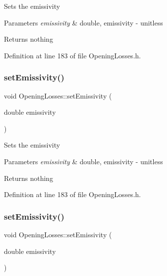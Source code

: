 Sets the emissivity


\begin{DoxyParams}{Parameters}
{\em emissivity} & double, emissivity -\/ unitless\\
\hline
\end{DoxyParams}
\begin{DoxyReturn}{Returns}
nothing 
\end{DoxyReturn}


Definition at line 183 of file Opening\+Losses.\+h.

\mbox{\label{class_opening_losses_aa63eb1c2ba9057d401f3a7f5dd974afe}} 
\subsubsection{\texorpdfstring{set\+Emissivity()}{setEmissivity()}\hspace{0.1cm}{\footnotesize\ttfamily [2/3]}}
{\footnotesize\ttfamily void Opening\+Losses\+::set\+Emissivity (\begin{DoxyParamCaption}\item[{double}]{emissivity }\end{DoxyParamCaption})\hspace{0.3cm}{\ttfamily [inline]}}

Sets the emissivity


\begin{DoxyParams}{Parameters}
{\em emissivity} & double, emissivity -\/ unitless\\
\hline
\end{DoxyParams}
\begin{DoxyReturn}{Returns}
nothing 
\end{DoxyReturn}


Definition at line 183 of file Opening\+Losses.\+h.

\mbox{\label{class_opening_losses_aa63eb1c2ba9057d401f3a7f5dd974afe}} 
\subsubsection{\texorpdfstring{set\+Emissivity()}{setEmissivity()}\hspace{0.1cm}{\footnotesize\ttfamily [3/3]}}
{\footnotesize\ttfamily void Opening\+Losses\+::set\+Emissivity (\begin{DoxyParamCaption}\item[{double}]{emissivity }\end{DoxyParamCaption})\hspace{0.3cm}{\ttfamily [inline]}}


